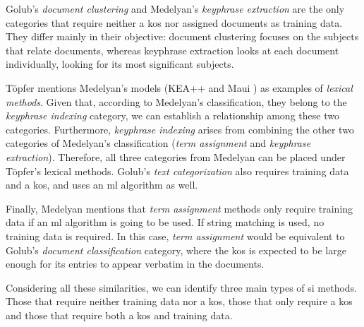 Golub's \textit{document clustering} and Medelyan's \textit{keyphrase extraction} are the only categories that require neither a \acrshort{kos} nor assigned documents as training data. They differ mainly in their objective: document clustering focuses on the subjects that relate documents, whereas keyphrase extraction looks at each document individually, looking for its most significant subjects.

Töpfer mentions Medelyan's models (KEA++ \cite{medelyan2008domain} and Maui \cite{medelyan2009human}) as examples of \textit{lexical methods}. Given that, according to Medelyan's classification, they belong to the \textit{keyphrase indexing} category, we can establish a relationship among these two categories. Furthermore, \textit{keyphrase indexing} arises from combining the other two categories of Medelyan's classification (\textit{term assignment} and \textit{keyphrase extraction}). Therefore, all three categories from Medelyan can be placed under Töpfer's lexical methods. Golub's \textit{text categorization} also requires training data and a \acrshort{kos}, and uses an \acrshort{ml} algorithm as well.

Finally, Medelyan mentions that \textit{term assignment} methods only require training data if an \acrshort{ml} algorithm is going to be used. If string matching is used, no training data is required. In this case, \textit{term assignment} would be equivalent to Golub's \textit{document classification} category, where the \acrshort{kos} is expected to be large enough for its entries to appear verbatim in the documents.

Considering all these similarities, we can identify three main types of \acrshort{si} methods. Those that require neither training data nor a \acrshort{kos}, those that only require a \acrshort{kos} and those that require both a \acrshort{kos} and training data.
